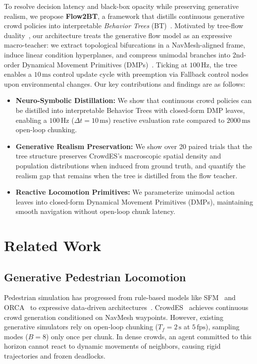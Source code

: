 \documentclass{sice-si}
\begin{document}
To resolve decision latency and black-box opacity while preserving generative realism, we propose \textbf{Flow2BT}, a framework that distills continuous generative crowd policies into interpretable \textit{Behavior Trees} (BT)~\cite{colledanchise2018behavior}. Motivated by tree-flow duality~\cite{ramachandran2026trees}, our architecture treats the generative flow model as an expressive macro-teacher: we extract topological bifurcations in a NavMesh-aligned frame, induce linear condition hyperplanes, and compress unimodal branches into 2nd-order Dynamical Movement Primitives (DMPs)~\cite{chatzilygeroudis2021behavior}. Ticking at $100\,\text{Hz}$, the tree enables a $10\,\text{ms}$ control update cycle with preemption via Fallback control nodes upon environmental changes.
\newpage
Our key contributions and findings are as follows:
\begin{itemize}[noitemsep, topsep=1pt]
    \item \textbf{Neuro-Symbolic Distillation:} We show that continuous crowd policies can be distilled into interpretable Behavior Trees with closed-form DMP leaves, enabling a $100\,\text{Hz}$ ($\Delta t = 10\,\text{ms}$) reactive evaluation rate compared to $2000\,\text{ms}$ open-loop chunking.
    \item \textbf{Generative Realism Preservation:} We show over 20 paired trials that the tree structure preserves CrowdES's macroscopic spatial density and population distributions when induced from ground truth, and quantify the realism gap that remains when the tree is distilled from the flow teacher.
    \item \textbf{Reactive Locomotion Primitives:} We parameterize unimodal action leaves into closed-form Dynamical Movement Primitives (DMPs), maintaining smooth navigation without open-loop chunk latency.
\end{itemize}

\section{Related Work}
\subsection{Generative Pedestrian Locomotion}
Pedestrian simulation has progressed from rule-based models like SFM~\cite{helbing1995social} and ORCA~\cite{vandenberg2011reciprocal} to expressive data-driven architectures~\cite{alahi2016social,lipman2023flow}. CrowdES~\cite{bae2025crowdes} achieves continuous crowd generation conditioned on NavMesh waypoints. However, existing generative simulators rely on open-loop chunking ($T_f = 2\,\text{s}$ at $5\,\text{fps}$), sampling modes ($B=8$) only once per chunk. In dense crowds, an agent committed to this horizon cannot react to dynamic movements of neighbors, causing rigid trajectories and frozen deadlocks.
\end{document}
